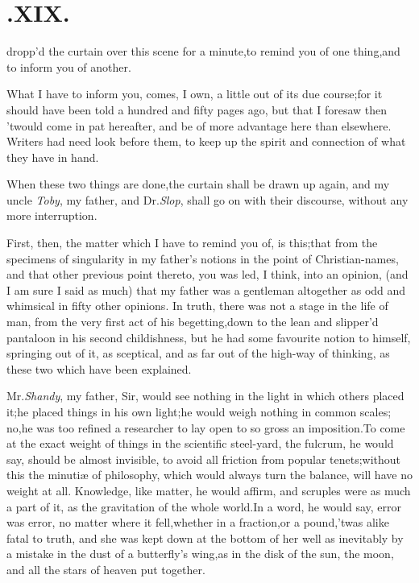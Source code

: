 \documentclass{article}
\begin{document}
\null
\section{.\enspace  XIX.}

 dropp’d the curtain over this\break
scene for a minute,\tsk to remind you of one
thing,\tsk and to inform you of an\-other.

What I have to inform you, comes, I own, a little out of its due
course;\tsh for it should have been told a hundred and
fifty pages ago, but that I foresaw then ’twould come in pat hereafter, and be of
more advantage here than elsewhere.\tsh\break
Writers had need look before them, to keep up the spirit and
connection of what they have in hand.

When these two things are done,\tsk the curtain shall be drawn
up again, and my uncle \textit{Toby}, my father, and Dr.\@ \textit{Slop},
shall go on with their discourse, without any more
interruption.

First, then, the matter which I have to remind you of, is
this;\tsh that from the specimens of singularity in my
father’s notions in the point of Christian-names, and that
other previous point thereto,\tsk\break
you was led, I think, into an opinion,
(and I am sure I said as much) that my father was a
gentleman altogether as odd
and whimsical in fifty other opinions.
In truth, there was not a stage in the life of man, from the very
first act of his be\-getting,\tsh down to the lean and
slipper’d pantaloon in his second childishness, but he had some
favourite notion to himself, springing out of it, as sceptical, and
as far out of the high-way of thinking, as these two which have been
explained.

\tsk Mr.\@ \textit{Shandy}, my father, Sir, would see nothing in
the light in which others placed it;\tsk he placed things in his
own light;\tsk he would weigh nothing in common scales;\tsk
no,\tsk he was too refined a researcher to lay open to so gross an
imposition.\tsk To come at the exact weight of things in the
scientific steel-yard, the fulcrum, he would say, should be almost
invisible, to avoid all friction from popular tenets;\tsk without
this the minutiæ of philosophy, which would always turn the
balance, will have no weight at all.\tsk\break
Knowledge, like matter, he would affirm,
and scruples were as much a part of it, as the gravitation of the whole world.\tsk In
a word, he would say, error was error,\tsk\break
no matter where it fell,\tsh whether in a fraction,\tsh or a pound,\tsk ’twas alike
fatal to truth, and she was kept down at the bottom of her well
as inevitably by a mistake in the dust of a butterfly’s
wing,\break\tsk as in the disk of the sun, the moon, and all the stars
of heaven put together.
\end{document}
